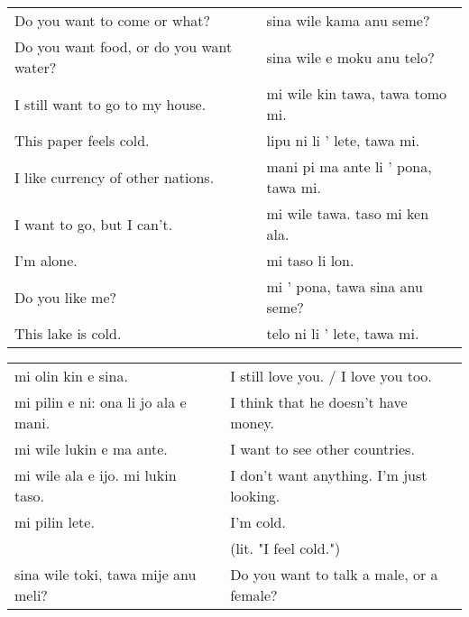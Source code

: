 \begin{supertabular}{p{5,5cm}|ll}
    Do you want to come or what?            &  & sina wile kama anu seme?            \\ %
    Do you want food, or do you want water? &  & sina wile e moku anu telo?          \\ %
    I still want to go to my house.         &  & mi wile kin tawa, tawa tomo mi.     \\ %
    This paper feels cold.                  &  & lipu ni li ' lete, tawa mi.         \\ %
    I like currency of other nations.       &  & mani pi ma ante li ' pona, tawa mi. \\ %
    I want to go, but I can't.              &  & mi wile tawa. taso mi ken ala.      \\ %
    I'm alone.                              &  & mi taso li lon.                     \\ %
    Do you like me?                         &  & mi ' pona, tawa sina anu seme?      \\ %
    This lake is cold.                      &  & telo ni li ' lete, tawa mi.         \\ %
\end{supertabular}

\begin{supertabular}{p{5,5cm}|ll}
    mi olin kin e sina.                  &  & I still love you. / I love you too.      \\
    mi pilin e ni: ona li jo ala e mani. &  & I think that he doesn't have money.      \\
    mi wile lukin e ma ante.             &  & I want to see other countries.           \\
    mi wile ala e ijo. mi lukin taso.    &  & I don't want anything. I'm just looking. \\
    mi pilin lete.                       &  & I'm cold.                                \\
                                         &  & (lit. "I feel cold.")                    \\ %
    sina wile toki, tawa mije anu meli?  &  & Do you want to talk a male, or a female? \\
\end{supertabular}


